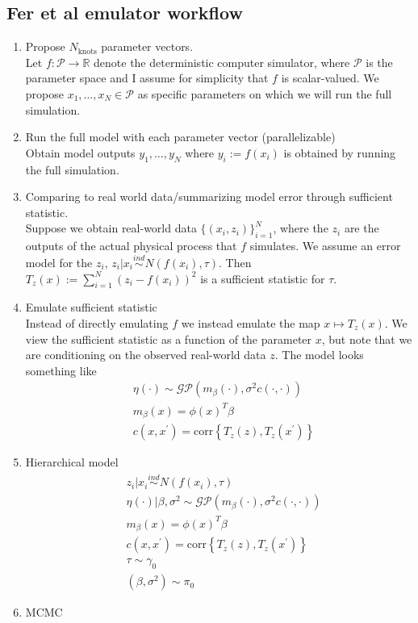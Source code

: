 \documentclass[12pt]{article}
\newcommand{\R}{\mathcal{R}}
\def\R{\mathbb{R}}
\begin{document}
\subsection{Fer et al emulator workflow}
\begin{enumerate} 
\item Propose $N_\text{knots}$ parameter vectors. \\[.2cm]
Let $f: \mathcal{P} \to \R$ denote the deterministic computer simulator, where $\mathcal{P}$ is the parameter space and I assume for simplicity that $f$ is scalar-valued. 
We propose $x_1, \dots, x_N \in \mathcal{P}$ as specific parameters on which we will run the full simulation. 

\item Run the full model with each parameter vector (parallelizable) \\[.2cm]
Obtain model outputs $y_1, \dots, y_N$ where $y_i := f(x_i)$ is obtained by running the full simulation. 

\item Comparing to real world data/summarizing model error through sufficient statistic. \\[.2cm]
Suppose we obtain real-world data $\{(x_i, z_i)\}_{i = 1}^N$, where the $z_i$ are the outputs of the actual physical process that $f$ simulates. We assume an error model 
for the $z_i$, $z_i|x_i \overset{ind}{\sim} N(f(x_i), \tau)$. Then $T_z(x) := \sum_{i = 1}^{N} (z_i - f(x_i))^2$ is a sufficient statistic for $\tau$.

\item Emulate sufficient statistic \\[.2cm]
Instead of directly emulating $f$ we instead emulate the map $x \mapsto T_z(x)$. We view the sufficient statistic as a function of the parameter $x$, but note that we are conditioning 
on the observed real-world data $z$. The model looks something like 
\begin{align*}
&\eta(\cdot) \sim \mathcal{GP}(m_\beta(\cdot), \sigma^2 c(\cdot, \cdot)) \\
&m_{\beta}(x) = \phi(x)^T \beta \\
&c(x, x^\prime) = \text{corr}\left\{T_z(z), T_z(x^\prime)\right\}
\end{align*}

\item Hierarchical model \\[.2cm]
\begin{align*}
&z_i|x_i \overset{ind}{\sim} N(f(x_i), \tau) \\
&\eta(\cdot)|\beta, \sigma^2 \sim \mathcal{GP}(m_\beta(\cdot), \sigma^2 c(\cdot, \cdot)) \\
&m_{\beta}(x) = \phi(x)^T \beta \\
&c(x, x^\prime) = \text{corr}\left\{T_z(z), T_z(x^\prime)\right\} \\
&\tau \sim \gamma_0 \\
&(\beta, \sigma^2) \sim \pi_0
\end{align*}

\item MCMC \\[.2cm]


\end{enumerate}
\end{document}
